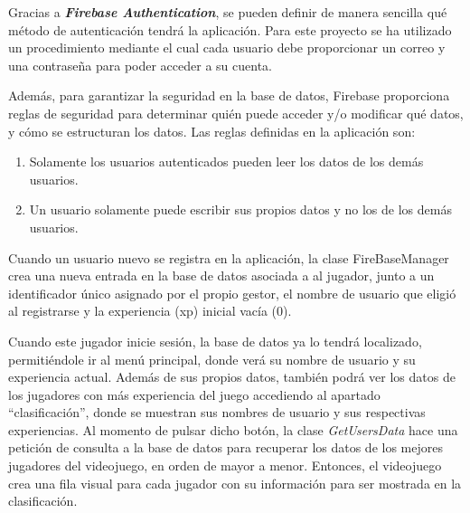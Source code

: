 Gracias a \textbf{\textit{Firebase Authentication}}, se pueden definir de manera sencilla qué método de autenticación tendrá la aplicación. Para este proyecto se ha utilizado un procedimiento mediante el cual cada usuario debe proporcionar un correo y una contraseña para poder acceder a su cuenta.

Además, para garantizar la seguridad en la base de datos, Firebase proporciona reglas de seguridad para determinar quién puede acceder y/o modificar qué datos, y cómo se estructuran los datos.
Las reglas definidas en la aplicación son:
\begin{enumerate}
    \item Solamente los usuarios autenticados pueden leer los datos de los demás usuarios.
    \item Un usuario solamente puede escribir sus propios datos y no los de los demás usuarios.
\end{enumerate}
Cuando un usuario nuevo se registra en la aplicación, la clase FireBaseManager crea una nueva entrada en la base de datos asociada a al jugador, junto a un identificador único asignado por el propio gestor, el nombre de usuario que eligió al registrarse y la experiencia (xp) inicial vacía (0). 

Cuando este jugador inicie sesión, la base de datos ya lo tendrá localizado, permitiéndole ir al menú principal, donde verá su nombre de usuario y su experiencia actual. 
Además de sus propios datos, también podrá ver los datos de los jugadores con más experiencia del juego accediendo al apartado ``clasificación'', donde se muestran sus nombres de usuario y sus respectivas experiencias. Al momento de pulsar dicho botón, la clase \textit{GetUsersData} hace una petición de consulta a la base de datos para recuperar los datos de los mejores jugadores del videojuego, en orden de mayor a menor. Entonces, el videojuego crea una fila visual para cada jugador con su información para ser mostrada en la clasificación.

